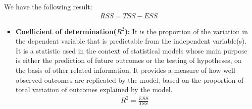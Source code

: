 \documentclass[notoc]{tufte-book}
\begin{document}
We  have the following result:
\begin{align}
    RSS=TSS-ESS
\end{align}
\begin{itemize}
    \item \textbf{Coefficient of determination($R^2$): }It is the proportion of the variation in the dependent variable that is predictable from the independent variable(s).
It is a statistic used in the context of statistical models whose main purpose is either the prediction of future outcomes or the testing of hypotheses, on the basis of other related information. It provides a measure of how well observed outcomes are replicated by the model, based on the proportion of total variation of outcomes explained by the model.\begin{align}
    R^2=\frac{ESS}{TSS}
\end{align}
\end{itemize}
\end{document}
